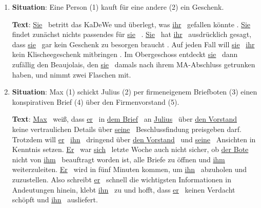 \begin{enumerate}
  \item\doublespacing%
      \textbf{Situation}: Eine Person (1) kauft für eine andere (2) ein Geschenk.
      
      \textbf{Text}: \uline{Sie}~ betritt das KaDeWe und überlegt, was \uline{ihr}~ gefallen könnte .
      \uline{Sie}~ findet zunächst nichts passendes für \uline{sie}~ .
      \uline{Sie}~ hat \uline{ihr}~ ausdrücklich gesagt, dass \uline{sie}~ gar kein Geschenk zu besorgen braucht .
      Auf jeden Fall will \uline{sie}~ \uline{ihr}~ kein Klischeegeschenk mitbringen .
      Im Obergeschoss entdeckt \uline{sie}~ dann zufällig den Beaujolais, den \uline{sie}~ damals nach ihrem MA-Abschluss getrunken haben, und nimmt zwei Flaschen mit.
    \Zeile
  \item\doublespacing
      \textbf{Situation}: Max (1) schickt Julius (2) per firmeneigenem Briefboten (3) einen konspirativen Brief (4) über den Firmenvorstand (5).

      \textbf{Text}: \uline{Max}~ weiß, dass \uline{er}~ in \uline{dem Brief}~ an \uline{Julius}~ über \uline{den Vorstand}~ keine vertraulichen Details über \uline{seine}~ Beschlussfindung preisgeben darf.
      Trotzdem will \uline{er}~ \uline{ihn}~ dringend über \uline{den Vorstand}~ und \uline{seine}~ Ansichten in Kenntnis setzen.
      \uline{Er}~ war \uline{sich}~ letzte Woche auch nicht sicher, ob \uline{der Bote}~ nicht von \uline{ihm}~ beauftragt worden ist, alle Briefe zu öffnen und \uline{ihm}~ weiterzuleiten.
      \uline{Er}~ wird in fünf Minuten kommen, um \uline{ihn}~ abzuholen und zuzustellen.
      Also schreibt \uline{er}~ schnell die wichtigsten Informationen in Andeutungen hinein, klebt \uline{ihn}~ zu und hofft, dass \uline{er}~ keinen Verdacht schöpft und \uline{ihn}~ ausliefert.
\end{enumerate}


